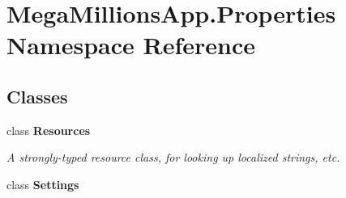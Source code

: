 \hypertarget{namespace_mega_millions_app_1_1_properties}{}\section{Mega\+Millions\+App.\+Properties Namespace Reference}
\label{namespace_mega_millions_app_1_1_properties}
\subsection*{Classes}
\begin{DoxyCompactItemize}
\item 
class {\bfseries Resources}
\begin{DoxyCompactList}\small\item\em A strongly-\/typed resource class, for looking up localized strings, etc. \end{DoxyCompactList}\item 
class {\bfseries Settings}
\end{DoxyCompactItemize}
